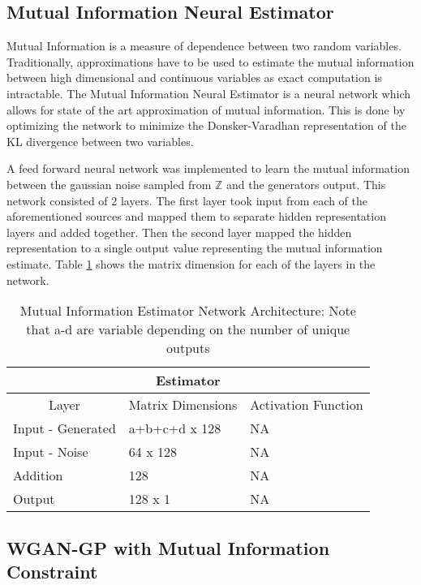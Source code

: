 \subsection{Mutual Information Neural Estimator}
\label{sec:mine}
Mutual Information is a measure of dependence between two random variables. Traditionally, approximations have to be used to estimate the mutual information between high dimensional and continuous variables as exact computation is intractable. The Mutual Information Neural Estimator is a neural network which allows for state of the art approximation of mutual information. This is done by optimizing the network to minimize the Donsker-Varadhan representation of the KL divergence between two variables. 

A feed forward neural network was implemented to learn the mutual information between the gaussian noise sampled from $\mathbb{Z}$ and the generators output. This network consisted of 2 layers. The first layer took input from each of the aforementioned sources and mapped them to separate hidden representation layers and added together. Then the second layer mapped the hidden representation to a single output value representing the mutual information estimate. Table \ref{tab:model_mi} shows the matrix dimension for each of the layers in the network.

\begin{table}[!htbp]
	\centering
	\caption{Mutual Information Estimator Network Architecture: Note that a-d are variable depending on the number of unique outputs}
	\label{tab:model_mi}
	\begin{tabular}{l|l|l}
		\hline
		\multicolumn{3}{c}{\textbf{Estimator}} \\ 
		\hline
		\multicolumn{1}{c|}{Layer} & \multicolumn{1}{c|}{Matrix Dimensions} & \multicolumn{1}{c}{Activation Function} \\ \hline
		Input - Generated & a+b+c+d x 128 & NA \\
		Input - Noise & 64 x 128 & NA \\
		Addition & 128 & NA \\ 
		Output & 128 x 1 &  NA \\
		\hline
	\end{tabular}
\end{table}


\subsection{WGAN-GP with Mutual Information Constraint}
\label{sec:gpmi}

